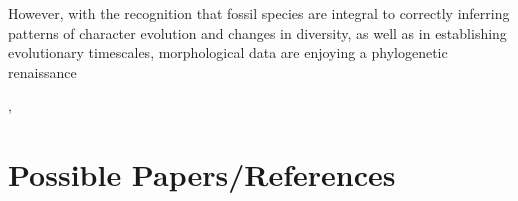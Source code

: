 \documentclass[11pt,letterpaper]{article}
\begin{document}
\citep{lee2015morphological}

However, with the recognition that fossil species are integral to correctly inferring patterns of character evolution and changes in diversity, as well as in establishing evolutionary timescales, morphological data are enjoying a phylogenetic renaissance 

\citep{dembo2016evolutionary}, \citep{o2016bayesian}


\section{Possible Papers/References}

\citep{halliday2016eutherian}
\citep{halliday2016impact}
\citep{halliday2017resolving}
\citep{halliday2016eutherians}
\citep{beck2014ancient}
\citep{arcila2015evaluation}
\citep{near2004assessing}
\citep{lee2015morphological}
\citep{puttick2016dating}
\citep{pyron2016novel}
\citep{turner2017empirical}
\citep{heath2014fossilized}
\citep{wiens2004role}
\citep{nabhan2011impact}
\citep{dembo2016evolutionary}
\citep{o2016bayesian}




\end{document}
